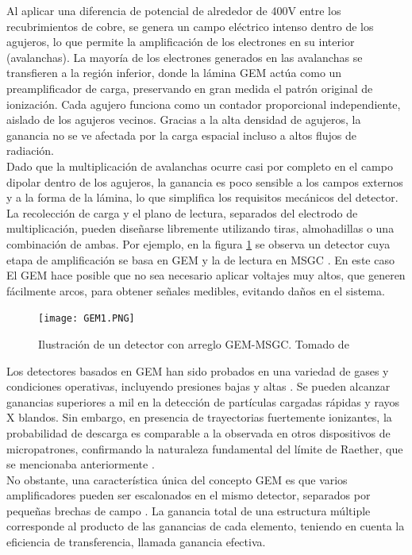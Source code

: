 \documentclass{article}
\begin{document}
\noindent Al aplicar una diferencia de potencial de alrededor de 400V entre los recubrimientos de cobre, se genera un campo eléctrico intenso dentro de los agujeros, lo que permite la amplificación de los electrones en su interior (avalanchas). La mayoría de los electrones generados en las avalanchas se transfieren a la región inferior, donde la lámina GEM actúa como un preamplificador de carga, preservando en gran medida el patrón original de ionización. Cada agujero funciona como un contador proporcional independiente, aislado de los agujeros vecinos. Gracias a la alta densidad de agujeros, la ganancia no se ve afectada por la carga espacial incluso a altos flujos de radiación.\\ 

\noindent Dado que la multiplicación de avalanchas ocurre casi por completo en el campo dipolar dentro de los agujeros, la ganancia es poco sensible a los campos externos y a la forma de la lámina, lo que simplifica los requisitos mecánicos del detector. La recolección de carga y el plano de lectura, separados del electrodo de multiplicación, pueden diseñarse libremente utilizando tiras, almohadillas o una combinación de ambas. Por ejemplo, en la figura \ref{fig:gem_MSGC} se observa un detector cuya etapa de amplificación se basa en GEM y la de lectura en MSGC \cite{zeuner2000msgc}. En este caso El GEM hace posible que no sea necesario aplicar voltajes muy altos, que generen fácilmente arcos, para obtener señales medibles, evitando daños en el sistema. 

\begin{figure}[H]
    \centering
    \texttt{[image: GEM1.PNG]}
    \caption{Ilustración de un detector con arreglo GEM-MSGC. Tomado de \cite{zeuner2000msgc}}
    \label{fig:gem_MSGC}
\end{figure}

\noindent Los detectores basados en GEM han sido probados en una variedad de gases y condiciones operativas, incluyendo presiones bajas y altas \cite{sauli2014gas}. Se pueden alcanzar ganancias superiores a mil en la detección de partículas cargadas rápidas y rayos X blandos. Sin embargo, en presencia de trayectorias fuertemente ionizantes, la probabilidad de descarga es comparable a la observada en otros dispositivos de micropatrones, confirmando la naturaleza fundamental del límite de Raether, que se mencionaba anteriormente \cite{bachmann1999charge}.\\

\noindent No obstante, una característica única del concepto GEM es que varios amplificadores pueden ser escalonados en el mismo detector, separados por pequeñas brechas de campo \cite{bouclier1997gas} \cite{benlloch1998further}. La ganancia total de una estructura múltiple corresponde al producto de las ganancias de cada elemento, teniendo en cuenta la eficiencia de transferencia, llamada ganancia efectiva.\\
\end{document}
